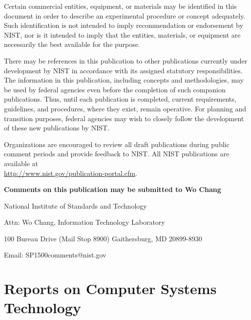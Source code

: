 \begin{mdframed}[backgroundcolor=black!5,topline=false,bottomline=false,rightline=false,leftline=false]

  Certain commercial entities, equipment, or materials may be
  identified in this document in order to describe an experimental
  procedure or concept adequately. Such identification is not intended
  to imply recommendation or endorsement by NIST, nor is it intended
  to imply that the entities, materials, or equipment are necessarily
  the best available for the purpose.

  There may be references in this publication to other publications
  currently under development by NIST in accordance with its assigned
  statutory responsibilities. The information in this publication,
  including concepts and methodologies, may be used by federal
  agencies even before the completion of such companion
  publications. Thus, until each publication is completed, current
  requirements, guidelines, and procedures, where they exist, remain
  operative. For planning and transition purposes, federal agencies
  may wish to closely follow the development of these new publications
  by NIST.

  Organizations are encouraged to review all draft publications during
  public comment periods and provide feedback
  to NIST. All NIST publications are available at \\
  \url{http://www.nist.gov/publication-portal.cfm}.

\end{mdframed}

\bigskip \bigskip \bigskip

\begin{center}
{\bf Comments on this publication may be submitted to Wo Chang}
\bigskip

National Institute of Standards and Technology

Attn: Wo Chang, Information Technology Laboratory

100 Bureau Drive (Mail Stop 8900) Gaithersburg, MD 20899-8930

Email: SP1500comments@nist.gov 
\end{center}

\newpage

\section*{\hfill Reports on Computer Systems Technology \hfill}

